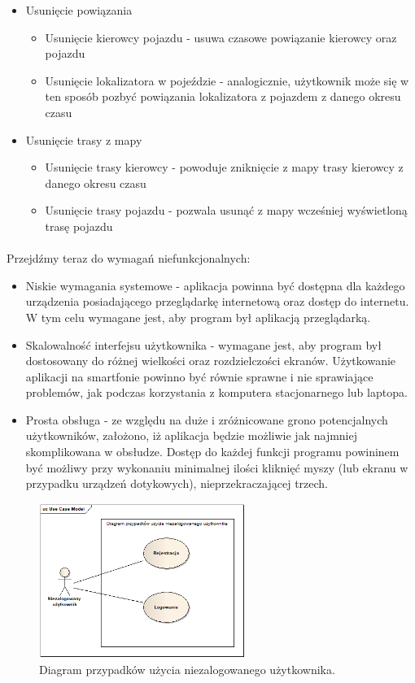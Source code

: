 \begin{itemize}
\item Usunięcie powiązania
\begin{itemize}
	\item Usunięcie kierowcy pojazdu - usuwa czasowe powiązanie kierowcy oraz pojazdu
	\item Usunięcie lokalizatora w pojeździe - analogicznie, użytkownik może się w ten sposób pozbyć powiązania lokalizatora z pojazdem z danego okresu czasu
\end{itemize}
\item Usunięcie trasy z mapy
\begin{itemize}
	\item Usunięcie trasy kierowcy - powoduje zniknięcie z mapy trasy kierowcy z danego okresu czasu
	\item Usunięcie trasy pojazdu - pozwala usunąć z mapy wcześniej wyświetloną trasę pojazdu 
\end{itemize}
\end{itemize}


\paragraph{}
Przejdźmy teraz do wymagań niefunkcjonalnych:

\begin{itemize}
	\item Niskie wymagania systemowe - aplikacja powinna być dostępna dla każdego urządzenia posiadającego przeglądarkę internetową oraz dostęp do internetu. W tym celu wymagane jest, aby program był aplikacją przeglądarką.
	\item Skalowalność interfejsu użytkownika - wymagane jest, aby program był dostosowany do różnej wielkości oraz rozdzielczości ekranów. Użytkowanie aplikacji na smartfonie powinno być równie sprawne i nie sprawiające problemów, jak podczas korzystania z komputera stacjonarnego lub laptopa.
	\item Prosta obsługa - ze względu na duże i zróżnicowane grono potencjalnych użytkowników, założono, iż aplikacja będzie możliwie jak najmniej skomplikowana w obsłudze. Dostęp do każdej funkcji programu powininem być możliwy przy wykonaniu minimalnej ilości kliknięć myszy (lub ekranu w przypadku urządzeń dotykowych), nieprzekraczającej trzech.
\end{itemize}

\begin{figure}
\centering
\includegraphics[width=0.6\textwidth]{./graf/Przypadki_uzycia_niezalogowany.png}
\caption{Diagram przypadków użycia niezalogowanego użytkownika.}
\label{fig:3.1}
\end{figure}

